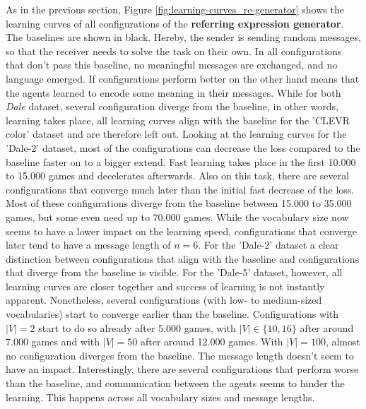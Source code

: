 As in the previous section, Figure \ref{fig:learning-curves_re-generator} shows the learning curves of all configurations of the \textbf{referring expression generator}.
The baselines are shown in black.
Hereby, the sender is sending random messages, so that the receiver needs to solve the task on their own.
In all configurations that don't pass this baseline, no meaningful messages are exchanged, and no language emerged.
If configurations perform better on the other hand means that the agents learned to encode some meaning in their messages.
While for both \emph{Dale} dataset, several configuration diverge from the baseline, in other words, learning takes place, all learning curves align with the baseline for the 'CLEVR color' dataset and are therefore left out.
Looking at the learning curves for the 'Dale-2' dataset, most of the configurations can decrease the loss compared to the baseline faster on to a bigger extend.
Fast learning takes place in the first 10.000 to 15.000 games and decelerates afterwards.
Also on this task, there are several configurations that converge much later than the initial fast decrease of the loss.
Most of these configurations diverge from the baseline between 15.000 to 35.000 games, but some even need up to 70.000 games.
While the vocabulary size now seems to have a lower impact on the learning speed, configurations that converge later tend to have a message length of $n=6$.
For the 'Dale-2' dataset a clear distinction between configurations that align with the baseline and configurations that diverge from the baseline is visible.
For the 'Dale-5' dataset, however, all learning curves are closer together and success of learning is not instantly apparent.
Nonetheless, several configurations (with low- to medium-sized vocabularies) start to converge earlier than the baseline.
Configurations with $|V|=2$ start to do so already after 5.000 games, with $|V|\in\{10,16\}$ after around 7.000 games and with $|V|=50$ after around 12.000 games.
With $|V|=100$, almost no configuration diverges from the baseline.
The message length doesn't seem to have an impact.
Interestingly, there are several configurations that perform worse than the baseline, and communication between the agents seems to hinder the learning.
This happens across all vocabulary sizes and message lengths.

